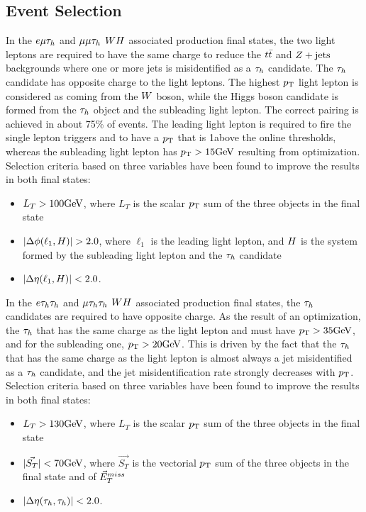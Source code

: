 \subsection{Event Selection}
\label{sec:vh_evt_selection}
In the $e\mu\tau_{h}$ and $\mu\mu\tau_{h}$ $WH$ associated production final states, 
the two light leptons are required to have the same charge to reduce the $t\bar{t}$ 
and $Z+\textrm{jets}$ backgrounds where one or more jets is misidentified as a $\tau_{h}$ 
candidate. The $\tau_{h}$ candidate has opposite charge to the light leptons. The highest $p_\mathrm{T}$
light lepton is considered as coming from the $W$ boson, while the Higgs boson 
candidate is formed from the $\tau_{h}$ object and the subleading light lepton. The 
correct pairing is achieved in about 75\% of events. The leading light lepton is required 
to fire the single lepton triggers and to have a $p_\mathrm{T}$ that is 1\GeV above the online 
thresholds, whereas the subleading light lepton has $p_\mathrm{T}>15\mathrm{GeV}$ resulting from
optimization. Selection criteria based on three variables have been found to 
improve the results in both final states:
\begin{itemize}
\item $L_T>100\mathrm{GeV}$, where $L_T$ is the scalar $p_\mathrm{T}$ sum of the three objects in the final state
\item $\lvert\Delta\phi(\ell_1,H)\rvert>2.0$, where $\ell_1$ is the leading light lepton, and 
$H$ is the system formed by the subleading light lepton and the $\tau_{h}$ candidate
\item $\lvert\Delta\eta(\ell_1,H)\rvert<2.0$.
\end{itemize}


In the $e\tau_{h}\tau_{h}$ and $\mu\tau_{h}\tau_{h}$ $WH$ associated production final states, 
the $\tau_{h}$ candidates are required to have opposite charge. As the result 
of an optimization, the $\tau_{h}$ that has the same charge as the light lepton and must 
have $p_\mathrm{T} > 35\mathrm{GeV}$, and for the subleading one, $p_\mathrm{T} > 20\mathrm{GeV}$. This is driven 
by the fact that the $\tau_{h}$ that has the same charge as the light lepton is almost 
always a jet misidentified as a $\tau_{h}$ candidate, and the jet misidentification 
rate strongly decreases with $p_\mathrm{T}$. Selection criteria based on three variables 
have been found to improve the results in both final states:
\begin{itemize}
\item $L_T>130\mathrm{GeV}$, where $L_T$ is the scalar $p_\mathrm{T}$ sum of the three objects in the final state
\item $\lvert\vec{S_T}\rvert<70\mathrm{GeV}$, where $\vec{S_T}$ is the vectorial $p_\mathrm{T}$ sum of the three objects in the final state and of $\vec{E}^{miss}_T$
\item $\lvert\Delta\eta(\tau_{h},\tau_{h})\rvert<2.0$.
\end{itemize}



